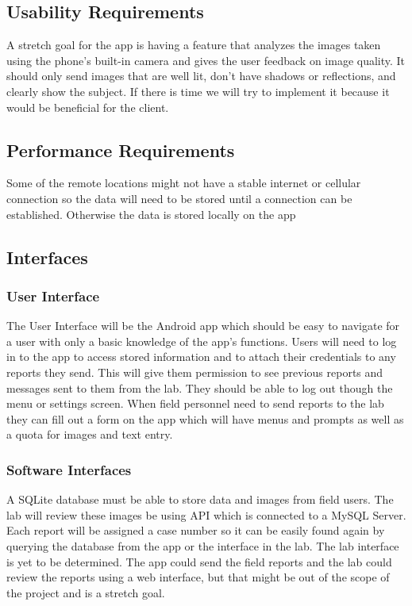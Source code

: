 \documentclass[onecolumn, draftclsnofoot,10pt, compsoc]{IEEEtran}
\begin{document}
\subsection{Usability Requirements}
A stretch goal for the app is having a feature that analyzes the images taken using the phone's built-in camera and gives the user feedback on image quality. 
It should only send images that are well lit, don’t have shadows or reflections, and clearly show the subject. 
If there is time we will try to implement it because it would be beneficial for the client. 

\subsection{Performance Requirements}
Some of the remote locations might not have a stable internet or cellular connection so the data will need to be stored until a connection can be established. Otherwise the data is stored locally on the app 

\subsection{Interfaces}
\subsubsection{User Interface}
The User Interface will be the Android app which should be easy to navigate for a user with only a basic knowledge of the app's functions. 
\newline
Users will need to log in to the app to access stored information and to attach their credentials to any reports they send. 
This will give them permission to see previous reports and messages sent to them from the lab. They should be able to log out though the menu or settings screen. 
When field personnel need to send reports to the lab they can fill out a form on the app which will have menus and prompts as well as a quota for images and text entry.

\subsubsection{Software Interfaces}
A SQLite database must be able to store data and images from field users.
The lab will review these images be using API which is connected to a MySQL Server. 
Each report will be assigned a case number so it can be easily found again by querying the database from the app or the interface in the lab. 
The lab interface is yet to be determined. 
The app could send the field reports and the lab could review the reports using  a web interface, but that might be out of the scope of the project and is a stretch goal. 
\end{document}
